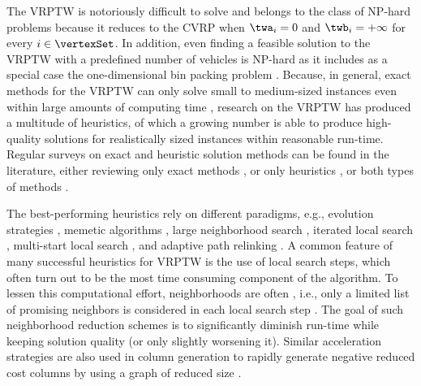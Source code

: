 \documentclass[11pt,a4paper,fleqn]{article}
\begin{document}
The VRPTW is notoriously difficult to solve and belongs to the class of NP-hard problems because it reduces to the CVRP  when $\twa_i = 0$ and $\twb_i = +\infty$ for every $i \in \vertexSet$. In addition, even finding a feasible solution to the VRPTW with a predefined number of vehicles is NP-hard as it includes as a special case the one-dimensional bin packing problem \citep{savelsbergh:85}. Because, in general, exact methods for the VRPTW can only solve small to medium-sized instances  even within large amounts of computing time \citep[see, e.g.,][]{kallehauge:08,baldacci:12}, research on the VRPTW has produced a multitude of heuristics, of which a growing number is able to produce high-quality solutions for realistically sized instances within reasonable run-time. Regular surveys on exact and heuristic solution methods can be found in the literature, either reviewing only exact methods \citep{baldacci:12}, or only heuristics \citep{braysy:05:1,braysy:05:2,gendreau:08,gendreau:10:vrptw}, or both types of methods \citep{cordeau:02:vrp,DesMR14}.

 The best-performing heuristics rely on different paradigms, e.g., evolution strategies \citep{mester:05}, memetic algorithms \citep{nagata:10,vidal:13}, large neighborhood search \citep{pisinger:07,prescott:09}, iterated local search \citep{ibaraki:08}, multi-start local search \citep{ibaraki:05,lim:07}, and adaptive path relinking \citep{tarantilis:13}. A common feature of many successful heuristics for VRPTW is the use of local search steps, which often turn out to be the most time consuming component of the algorithm. To lessen this computational effort, neighborhoods are often \reduced, i.e., only a limited list of promising neighbors is considered in each local search step \citep[see, e.g.,][]{potvin:96,ibaraki:05,ibaraki:08,vidal:13}. The goal of such neighborhood reduction schemes is to significantly diminish run-time while keeping solution quality (or only slightly worsening it). Similar acceleration strategies are also used in column generation to rapidly generate negative reduced cost columns by using a graph of reduced size \citep[see, e.g.][]{DesEtAl2008,desaulniers:14}.
\end{document}
